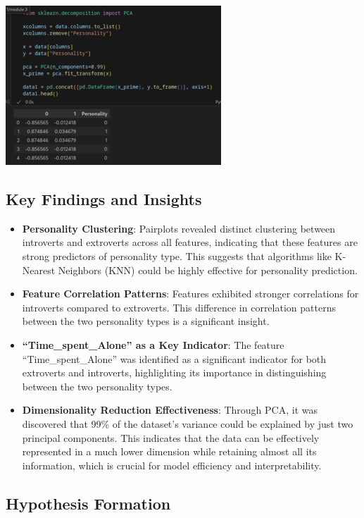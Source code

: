 \documentclass[
]{article}
\providecommand{\tightlist}{%
  \setlength{\itemsep}{0pt}\setlength{\parskip}{0pt}}
\begin{document}
\includegraphics{4_4.png}

\hypertarget{key-findings-and-insights}{%
\subsection{Key Findings and Insights}\label{key-findings-and-insights}}

\begin{itemize}
\tightlist
\item
  \textbf{Personality Clustering}: Pairplots revealed distinct
  clustering between introverts and extroverts across all features,
  indicating that these features are strong predictors of personality
  type. This suggests that algorithms like K-Nearest Neighbors (KNN)
  could be highly effective for personality prediction.
\item
  \textbf{Feature Correlation Patterns}: Features exhibited stronger
  correlations for introverts compared to extroverts. This difference in
  correlation patterns between the two personality types is a
  significant insight.
\item
  \textbf{``Time\_spent\_Alone'' as a Key Indicator}: The feature
  ``Time\_spent\_Alone'' was identified as a significant indicator for
  both extroverts and introverts, highlighting its importance in
  distinguishing between the two personality types.
\item
  \textbf{Dimensionality Reduction Effectiveness}: Through PCA, it was
  discovered that 99\% of the dataset's variance could be explained by
  just two principal components. This indicates that the data can be
  effectively represented in a much lower dimension while retaining
  almost all its information, which is crucial for model efficiency and
  interpretability.
\end{itemize}

\hypertarget{hypothesis-formation}{%
\subsection{Hypothesis Formation}\label{hypothesis-formation}}
\end{document}

